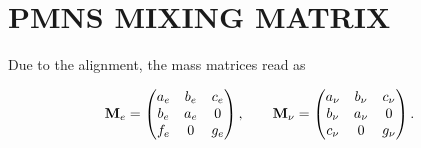 \documentclass[aps,prd,groupaddress,floatfix,tighten,nofootinbib,showpacs,amsfonts,superscriptaddress]{revtex4-2}
\begin{document}








\section{PMNS MIXING MATRIX}

Due to the alignment, the mass matrices read as

\begin{equation}
{\bf M}_{e}=\begin{pmatrix}
a_{e} & b_{e} & c_{e} \\ 
b_{e} & a_{e} & 0 \\ 
f_{e} & 0 & g_{e}
\end{pmatrix},\qquad {\bf M}_{\nu}=\begin{pmatrix}
a_{\nu} & b_{\nu} & c_{\nu} \\ 
b_{\nu} & a_{\nu} & 0 \\ 
c_{\nu} & 0 & g_{\nu}
\end{pmatrix}. 
\end{equation}
\end{document}
